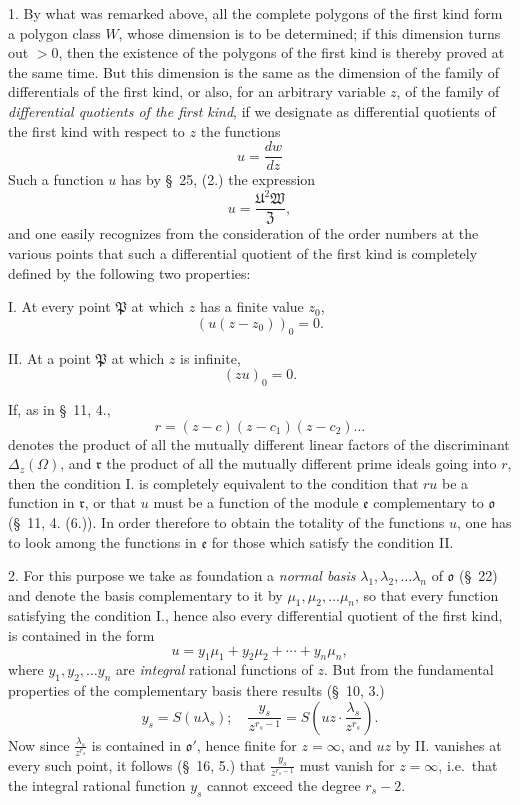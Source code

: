 \documentclass{article}
\begin{document}
1. By what was remarked above, all the complete polygons of the first kind form a polygon class $W$, whose dimension is to be determined; if this dimension turns out $> 0$, then the existence of the polygons of the first kind is thereby proved at the same time. But this dimension is the same as the dimension of the family of differentials of the first kind, or also, for an arbitrary variable $z$, of the family of \emph{differential quotients of the first kind}, if we designate as differential quotients of the first kind with respect to $z$ the functions
\[ u = \frac{dw}{dz} \]
Such a function $u$ has by §~25, (2.) the expression
\[ u = \frac{\mathfrak{U}^{2}\mathfrak{W}}{\mathfrak{Z}}, \]
and one easily recognizes from the consideration of the order numbers at the various points that such a differential quotient of the first kind is completely defined by the following two properties:

I. At every point $\mathfrak{P}$ at which $z$ has a finite value $z_{0}$,
\[ (u(z-z_{0}))_{0} = 0. \]


II. At a point $\mathfrak{P}$ at which $z$ is infinite,
\[ (zu)_{0} = 0. \]

If, as in §~11, 4.,
\[ r = (z-c)(z-c_{1})(z-c_{2})\ldots \]
denotes the product of all the mutually different linear factors of the discriminant $\Delta_{z}(\Omega)$, and $\mathfrak{r}$ the product of all the mutually different prime ideals going into $r$, then the condition I. is completely equivalent to the condition that $ru$ be a function in $\mathfrak{r}$, or that $u$ must be a function of the module $\mathfrak{e}$ complementary to $\mathfrak{o}$ (§~11, 4. (6.)). In order therefore to obtain the totality of the functions $u$, one has to look among the functions in $\mathfrak{e}$ for those which satisfy the condition II.

2. For this purpose we take as foundation a \emph{normal basis} $\lambda_{1}, \lambda_{2}, \ldots \lambda_{n}$ of $\mathfrak{o}$ (§~22) and denote the basis complementary to it by $\mu_{1}, \mu_{2}, \ldots \mu_{n}$, so that every function satisfying the condition I., hence also every differential quotient of the first kind, is contained in the form
\[ u = y_{1}\mu_{1} + y_{2}\mu_{2} + \cdots + y_{n}\mu_{n}, \tag{1.} \]
where $y_{1}, y_{2}, \ldots y_{n}$ are \emph{integral} rational functions of $z$. But from the fundamental properties of the complementary basis there results (§~10, 3.)
\[ y_{s} = S(u\lambda_{s}); \quad \frac{y_{s}}{z^{r_{s}-1}} = S\left(uz\cdot\frac{\lambda_{s}}{z^{r_{s}}}\right). \]
Now since $\frac{\lambda_{s}}{z^{r_{s}}}$ is contained in $\mathfrak{o}'$, hence finite for $z = \infty$, and $uz$ by II. vanishes at every such point, it follows (§~16, 5.) that $\frac{y_{s}}{z^{r_{s}-1}}$ must vanish for $z = \infty$, i.e.\ that the integral rational function $y_{s}$ cannot exceed the degree $r_{s}-2$.
\end{document}
